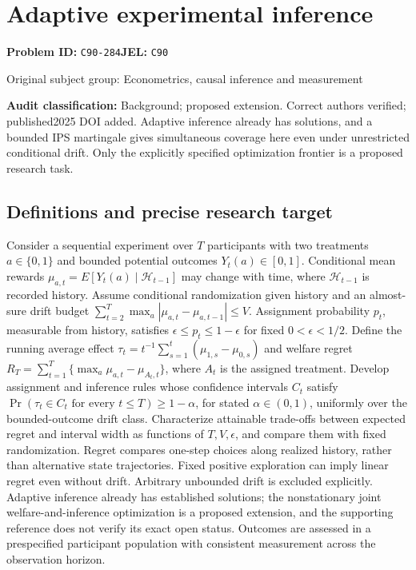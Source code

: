\documentclass[11pt,a4paper]{article}
\begin{document}
\section*{Adaptive experimental inference}
\textbf{Problem ID:} \texttt{C90-284}\quad \textbf{JEL:} \texttt{C90}\par
\label{problem:OP-0428}
{\sffamily\small\color{muted}Original subject group: Econometrics, causal inference and measurement\par}
\label{definitions:problem:30007710}
\textbf{Audit classification:} Background; proposed extension. Correct authors verified; published2025 DOI added. Adaptive inference already has solutions, and a bounded IPS martingale gives simultaneous coverage here even under unrestricted conditional drift. Only the explicitly specified optimization frontier is a proposed research task.
\subsection*{Definitions and precise research target}
Consider a sequential experiment over \(T\) participants with two treatments \(a\in\{0,1\}\) and bounded potential outcomes \(Y_t(a)\in[0,1]\). Conditional mean rewards \(\mu_{a,t}=E[Y_t(a)\mid\mathcal H_{t-1}]\) may change with time, where \(\mathcal H_{t-1}\) is recorded history. Assume conditional randomization given history and an almost-sure drift budget \(\sum_{t=2}^{T}\max_a|\mu_{a,t}-\mu_{a,t-1}|\leq V\). Assignment probability \(p_t\), measurable from history, satisfies \(\epsilon\leq p_t\leq1-\epsilon\) for fixed \(0<\epsilon<1/2\). Define the running average effect \(\tau_t=t^{-1}\sum_{s=1}^{t}(\mu_{1,s}-\mu_{0,s})\) and welfare regret \(R_T=\sum_{t=1}^{T}\{\max_a\mu_{a,t}-\mu_{A_t,t}\}\), where \(A_t\) is the assigned treatment. Develop assignment and inference rules whose confidence intervals \(C_t\) satisfy \(\Pr(\tau_t\in C_t\text{ for every }t\leq T)\geq1-\alpha\), for stated \(\alpha\in(0,1)\), uniformly over the bounded-outcome drift class. Characterize attainable trade-offs between expected regret and interval width as functions of \(T,V,\epsilon\), and compare them with fixed randomization. Regret compares one-step choices along realized history, rather than alternative state trajectories. Fixed positive exploration can imply linear regret even without drift. Arbitrary unbounded drift is excluded explicitly. Adaptive inference already has established solutions; the nonstationary joint welfare-and-inference optimization is a proposed extension, and the supporting reference does not verify its exact open status. Outcomes are assessed in a prespecified participant population with consistent measurement across the observation horizon.
\end{document}
